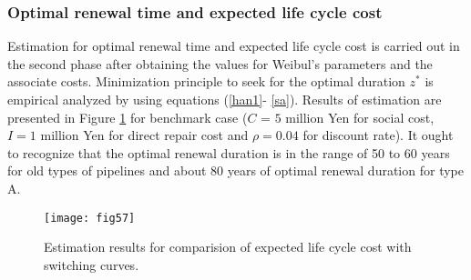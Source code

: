 \documentclass[a4paper,oneside,onecolumn,preprint,10pt,authoryear]{elsarticle}
\begin{document}
\subsubsection{Optimal renewal time and expected life cycle cost}
\label{5822}
Estimation for optimal renewal time and expected life cycle cost is carried out in the second phase after obtaining the values for Weibul's parameters and the associate costs. Minimization principle to seek for the optimal duration $z^*$ is empirical analyzed by using equations (\ref{han1}- \ref{sa}). Results of estimation are presented in Figure \ref{fig57} for benchmark case ($C$ = $5$ million Yen for social cost, $I=1$ million Yen for direct repair cost and $\rho=0.04$ for discount rate). It ought to recognize that the optimal renewal duration is in the range of 50 to 60 years for old types of pipelines and about 80 years of optimal renewal duration for type A.
\begin{figure}
\begin{center}
\texttt{[image: fig57]} 
\end{center}
\caption{Estimation results for comparision of expected life cycle cost with switching curves.}
\label{fig57} 
\end{figure}
\end{document}
